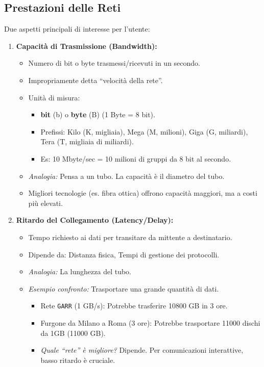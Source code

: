 \documentclass{article}
\begin{document}
\subsection{Prestazioni delle Reti}
Due aspetti principali di interesse per l'utente:
\begin{enumerate}
    \item \textbf{Capacità di Trasmissione (Bandwidth):}
    \begin{itemize}
        \item Numero di bit o byte trasmessi/ricevuti in un secondo.
        \item Impropriamente detta “velocità della rete”.
        \item Unità di misura:
        \begin{itemize}
            \item \textbf{bit} (b) o \textbf{byte} (B) (1 Byte = 8 bit).
            \item Prefissi: Kilo (K, migliaia), Mega (M, milioni), Giga (G, miliardi), Tera (T, migliaia di miliardi).
            \item Es: 10 Mbyte/sec = 10 milioni di gruppi da 8 bit al secondo.
        \end{itemize}
        \item \textit{Analogia:} Pensa a un tubo. La capacità è il diametro del tubo.
        \item Migliori tecnologie (es. fibra ottica) offrono capacità maggiori, ma a costi più elevati.
    \end{itemize}
    \item \textbf{Ritardo del Collegamento (Latency/Delay):}
    \begin{itemize}
        \item Tempo richiesto ai dati per transitare da mittente a destinatario.
        \item Dipende da: Distanza fisica, Tempi di gestione dei protocolli.
        \item \textit{Analogia:} La lunghezza del tubo.
        \item \textit{Esempio confronto:} Trasportare una grande quantità di dati.
        \begin{itemize}
            \item Rete \texttt{GARR} (1 GB/s): Potrebbe trasferire 10800 GB in 3 ore.
            \item Furgone da Milano a Roma (3 ore): Potrebbe trasportare 11000 dischi da 1GB (11000 GB).
            \item \textit{Quale “rete” è migliore?} Dipende. Per comunicazioni interattive, basso ritardo è cruciale.
        \end{itemize}
    \end{itemize}
\end{enumerate}
\end{document}
